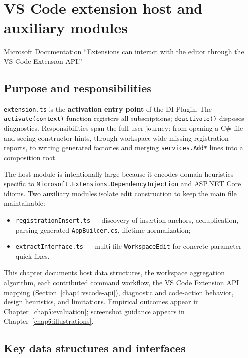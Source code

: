\chapter[Extension host]{VS Code extension host and auxiliary modules}
\label{chap4:extension}
\begin{chapquote}{Microsoft Documentation}
``Extensions can interact with the editor through the VS Code Extension API.''
\end{chapquote}

\section{Purpose and responsibilities}
\label{chap4:purpose}

\texttt{extension.ts} is the \textbf{activation entry point} of the DI Plugin. The \texttt{activate(context)} function registers all subscriptions; \texttt{deactivate()} disposes diagnostics. Responsibilities span the full user journey: from opening a C\# file and seeing constructor hints, through workspace-wide missing-registration reports, to writing generated factories and merging \texttt{services.Add*} lines into a composition root.

The host module is intentionally large because it encodes domain heuristics specific to \texttt{Microsoft.Extensions.DependencyInjection} and ASP.NET Core idioms. Two auxiliary modules isolate edit construction to keep the main file maintainable:
\begin{itemize}
	\item \texttt{registrationInsert.ts} --- discovery of insertion anchors, deduplication, parsing generated \texttt{AppBuilder.cs}, lifetime normalization;
	\item \texttt{extractInterface.ts} --- multi-file \texttt{WorkspaceEdit} for concrete-parameter quick fixes.
\end{itemize}

This chapter documents host data structures, the workspace aggregation algorithm, each contributed command workflow, the VS Code Extension API mapping (Section~\ref{chap4:vscode-api}), diagnostic and code-action behavior, design heuristics, and limitations. Empirical outcomes appear in Chapter~\ref{chap5:evaluation}; screenshot guidance appears in Chapter~\ref{chap6:illustrations}.

\section{Key data structures and interfaces}
\label{chap4:data-structures}

